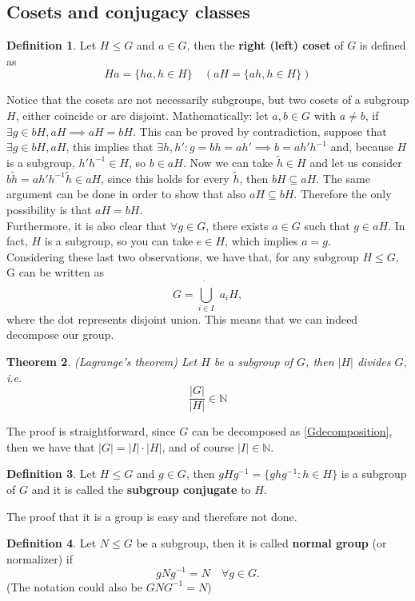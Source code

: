 \documentclass[12pt]{book}
\theoremstyle{plain}
\newtheorem{thm}{Theorem}[section]
\theoremstyle{definition}
\newtheorem{dfn}[thm]{Definition}
\theoremstyle{remark}
\begin{document}
\subsection{Cosets and conjugacy classes}
\begin{dfn}
Let $H\leq G$ and $a\in G$, then the \textbf{right (left) coset} of $G$ is defined as
\[Ha = \{ha,h\in H\}\quad  (aH = \{ah,h\in H\})\]
\end{dfn}
Notice that the cosets are not necessarily subgroups, but two cosets of a subgroup $H$, either coincide or are disjoint. Mathematically: let $a,b\in G$ with $a\neq b$, if $\exists g\in bH,aH \implies aH = bH$. This can be proved by contradiction, suppose that $\exists g\in bH,aH$, this implies that $\exists h,h':g=bh=ah' \implies b = ah'h^{-1}$ and, because $H$ is a subgroup,
$h'h^{-1}\in H$, so $b\in aH$. Now we can take $\widetilde{h}\in H$ and let us consider $b\widetilde{h} = ah'h^{-1}\widetilde{h} \in aH$, since this holds for every $\widetilde{h}$, then $bH\subseteq aH$. The same argument can be done in order to show that also $aH \subseteq bH$. Therefore the only possibility is that $aH = bH$.\\
Furthermore, it is also clear that $\forall g\in G$, there exists $a\in G$ such that $g\in aH$. In fact, $H$ is a subgroup, so you can take $e\in H$, which implies $a=g$.\\
Considering these last two observations, we have that, for any subgroup $H\leq G$, G can be written as
\begin{equation}\label{Gdecomposition}G = \dot{\bigcup_{i\in I}}\,\, a_i H,\end{equation}
where the dot represents disjoint union. This means that we can indeed decompose our group.
\begin{thm}(Lagrange's theorem)
Let $H$ be a subgroup of $G$, then $|H|$ divides $G$, i.e. 
\[\frac{|G|}{|H|} \in \mathbb{N}\]
\end{thm}
The proof is straightforward, since $G$ can be decomposed as \eqref{Gdecomposition}, then we have that $|G| = |I|\cdot |H|$, and of course $|I|\in \mathbb{N}$.
\begin{dfn}
Let $H\leq G$ and $g\in G$, then $gHg^{-1}= \{ghg^{-1}:h\in H\}$ is a subgroup of $G$ and it is called the \textbf{subgroup conjugate} to $H$.
\end{dfn}
The proof that it is a group is easy and therefore not done. 
\begin{dfn}
Let $N\leq G$ be a subgroup, then it is called \textbf{normal group} (or normalizer) if
\[gNg^{-1} = N \quad \forall g\in G.\]
(The notation could also be $GNG^{-1}=N$)
\end{dfn}
\end{document}
